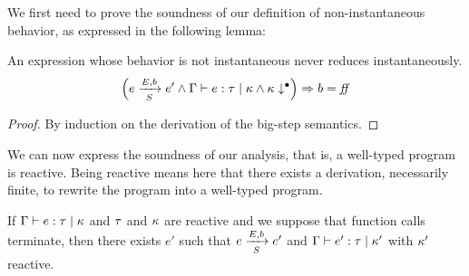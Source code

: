 \documentclass[9pt,preprint]{sigplanconf}
\begin{document}
We first need to prove the soundness of our definition of non-instantaneous behavior, as expressed in the following lemma:
\begin{lemma}
\label{lem:noinst}
An expression whose behavior is not instantaneous never reduces instantaneously.
\[
\left( \bigstep{N}{e}{e'} {E}{b}{S} \land \tyju{\tyenv}{e}{\rt}{\rk}
 \land \noinst{\rk}  \right) \Rightarrow b = \sfalse \]
\end{lemma}
\begin{proof}
By induction on the derivation of the big-step semantics.
\end{proof}

We can now express the soundness of our analysis, that is, a well-typed program is reactive. Being reactive means here that there exists a derivation, necessarily finite, to rewrite the program into a well-typed program.
\begin{theorem}[Soundness]
\label{thm:soundness}
If \mbox{$\tyju{\tyenv}{e}{\rt}{\rk}$} and $\rt$ and $\rk$ are reactive and we suppose that function calls terminate, then there exists $e'$ such that \mbox{$\bigstep{N}{e}{e'} {E}{b}{S}$} and \mbox{$\tyju{\tyenv}{e'}{\rt}{\rk'}$} with $\rk'$ reactive.
\end{theorem}
\end{document}
